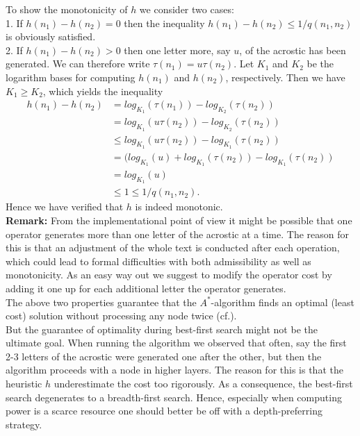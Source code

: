 \documentclass[11pt]{reportAlternative}
\begin{document}
To show the monotonicity of $h$ we consider two cases:\\
1. If $h(n_1)-h(n_2)=0$ then the inequality $h(n_1)-h(n_2)\le 1/q(n_1,n_2)$ is obviously satisfied.\\
2. If $h(n_1)-h(n_2)>0$ then one letter more, say $u$, of the acrostic has been generated. We can therefore write $\tau(n_1)=u\tau(n_2)$. Let $K_1$ and $K_2$ be the logarithm bases for computing $h(n_1)$ and $h(n_2)$, respectively. Then we have $K_1\ge K_2$, which yields the inequality
\begin{align*}
h(n_1)-h(n_2) &= log_{K_1}(\tau(n_1))-log_{K_2}(\tau(n_2))\\
			  &= log_{K_1}(u\tau(n_2))-log_{K_2}(\tau(n_2))\\
			  & \le log_{K_1}(u\tau(n_2))-log_{K_1}(\tau(n_2))\\
			  &= (log_{K_1}(u)+log_{K_1}(\tau(n_2))-log_{K_1}(\tau(n_2))\\
			  &= log_{K_1}(u) \\
			  & \le 1 \le 1/q(n_1,n_2).
\end{align*}
Hence we have verified that $h$ is indeed monotonic.\\


\textbf{Remark:} From the implementational point of view it might be possible that one operator generates more than one letter of the acrostic at a time. The reason for this is that an adjustment of the whole text is conducted after each operation, which could lead to formal difficulties with both admissibility as well as monotonicity. As an easy way out we suggest to modify the operator cost by adding it one up for each additional letter the operator generates.\\







The above two properties guarantee that the $A^*$-algorithm finds an optimal (least cost) solution without processing any node twice (cf.\cite{AstarAlgorithm}).\\
But the guarantee of optimality during best-first search might not be the ultimate goal.
When running the algorithm we observed that often, say the first 2-3 letters of the acrostic were generated one after the other, but then the algorithm proceeds with a node in higher layers. The reason for this is that the heuristic $h$ underestimate the cost too rigorously. As a consequence, the best-first search degenerates to a breadth-first search. Hence, especially when computing power is a scarce resource one should better be off with a depth-preferring strategy.
\end{document}
